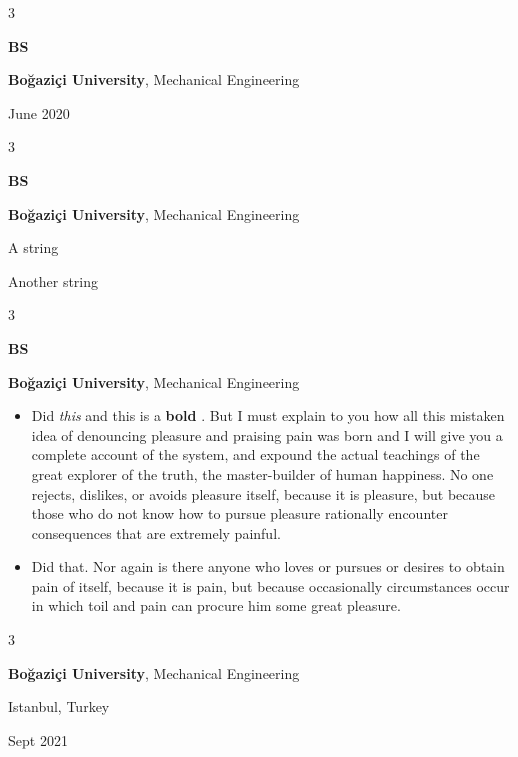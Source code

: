 \documentclass[10pt, letterpaper]{article}
\newenvironment{summary}{
    \begin{description}[
        topsep=0.10 cm,
        parsep=0.10 cm,
        partopsep=0pt,
        itemsep=0pt,
        leftmargin=0.4 cm + 10pt
    ]
}{
    \end{description}
} %
\newenvironment{highlights}{
    \begin{itemize}[
        topsep=0.10 cm,
        parsep=0.10 cm,
        partopsep=0pt,
        itemsep=0pt,
        leftmargin=0.4 cm + 10pt
    ]
}{
    \end{itemize}
} %
\newenvironment{threecolentry}[3][]{
    \onecolentry
    \def\thirdColumn{#3}
    \setcolumnwidth{1 cm, \fill, 4.5 cm}
    \begin{paracol}{3}
    {\raggedright #2} \switchcolumn
}{
    \switchcolumn \raggedleft \thirdColumn
    \end{paracol}
    \endonecolentry
} %
\let\hrefWithoutArrow\href
\renewcommand{\href}[2]{\hrefWithoutArrow{#1}{\ifthenelse{\equal{#2}{}}{ }{#2 }\raisebox{.15ex}{\footnotesize \faExternalLink*}}}
\begin{document}
        \begin{threecolentry}{\textbf{BS}}{
            June 2020
        }
            \textbf{Boğaziçi University}, Mechanical Engineering
        \end{threecolentry}

        \vspace{0.2 cm}

        \begin{threecolentry}{\textbf{BS}}{
            
        }
            \textbf{Boğaziçi University}, Mechanical Engineering
            \begin{summary}
                \item A string
                \item Another string
            \end{summary}
        \end{threecolentry}

        \vspace{0.2 cm}

        \begin{threecolentry}{\textbf{BS}}{
            
        }
            \textbf{Boğaziçi University}, Mechanical Engineering
            \begin{highlights}
                \item Did \textit{this} and this is a \textbf{bold} \href{https://example.com}{link}. But I must explain to you how all this mistaken idea of denouncing pleasure and praising pain was born and I will give you a complete account of the system, and expound the actual teachings of the great explorer of the truth, the master-builder of human happiness. No one rejects, dislikes, or avoids pleasure itself, because it is pleasure, but because those who do not know how to pursue pleasure rationally encounter consequences that are extremely painful.
                \item Did that. Nor again is there anyone who loves or pursues or desires to obtain pain of itself, because it is pain, but because occasionally circumstances occur in which toil and pain can procure him some great pleasure.
            \end{highlights}
        \end{threecolentry}

        \vspace{0.2 cm}

        \begin{threecolentry}{\textbf{}}{
            Istanbul, Turkey

        Sept 2021
        }
            \textbf{Boğaziçi University}, Mechanical Engineering
        \end{threecolentry}
\end{document}
